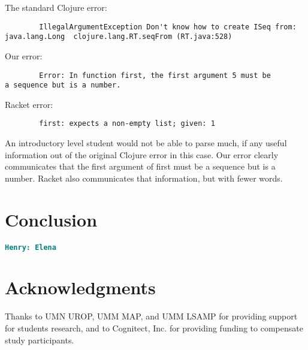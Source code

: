 \documentclass[12pt]{article}
\newcommand{\comment}[1]{{\bf \tt  {#1}}}
\newcommand{\hfcomment}[1]{\textcolor{Teal}{\comment{Henry: {#1}}}}
\begin{document}
	The standard Clojure error:
\begin{verbatim}
		IllegalArgumentException Don't know how to create ISeq from: 
java.lang.Long  clojure.lang.RT.seqFrom (RT.java:528)
\end{verbatim}		

	Our error:
\begin{verbatim}
		Error: In function first, the first argument 5 must be 
a sequence but is a number.
\end{verbatim}

	Racket error:
\begin{verbatim}
		first: expects a non-empty list; given: 1	
\end{verbatim}
	An introductory level student would not be able to parse much, if any useful information out of the original Clojure error in this case. 
	Our error clearly communicates that the first argument of first must be a sequence but is a number.
	Racket also communicates that information, but with fewer words. 


\section{Conclusion}\label{sec:conclusion}
	\hfcomment{Elena}

\section{Acknowledgments}
Thanks to UMN UROP, UMM MAP, and UMM LSAMP for providing support for students research, and to Cognitect, Inc. for providing funding to compensate study participants. 




\end{document}
